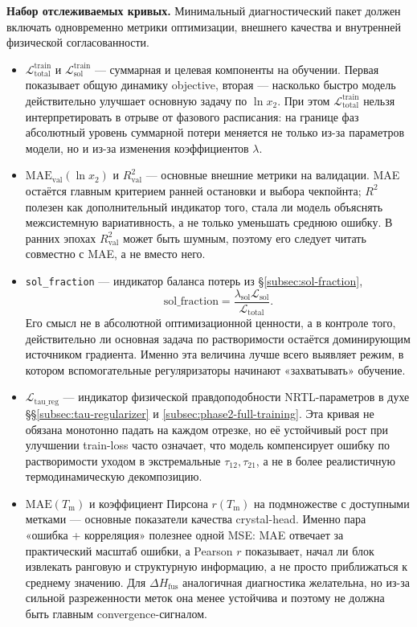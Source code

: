 \documentclass[11pt]{article}
\begin{document}
\textbf{Набор отслеживаемых кривых.} Минимальный диагностический пакет должен включать одновременно метрики оптимизации, внешнего качества и внутренней физической согласованности.
\begin{itemize}
  \item $\mathcal{L}_{\mathrm{total}}^{\mathrm{train}}$ и $\mathcal{L}_{\mathrm{sol}}^{\mathrm{train}}$ --- суммарная и целевая компоненты на обучении. Первая показывает общую динамику objective, вторая --- насколько быстро модель действительно улучшает основную задачу по $\ln x_2$. При этом $\mathcal{L}_{\mathrm{total}}^{\mathrm{train}}$ нельзя интерпретировать в отрыве от фазового расписания: на границе фаз абсолютный уровень суммарной потери меняется не только из-за параметров модели, но и из-за изменения коэффициентов $\lambda$.
  \item $\mathrm{MAE}_{\mathrm{val}}(\ln x_2)$ и $R^2_{\mathrm{val}}$ --- основные внешние метрики на валидации. MAE остаётся главным критерием ранней остановки и выбора чекпойнта; $R^2$ полезен как дополнительный индикатор того, стала ли модель объяснять межсистемную вариативность, а не только уменьшать среднюю ошибку. В ранних эпохах $R^2_{\mathrm{val}}$ может быть шумным, поэтому его следует читать совместно с MAE, а не вместо него.
  \item \texttt{sol\_fraction} --- индикатор баланса потерь из §\ref{subsec:sol-fraction},
  \begin{equation*}
  \mathrm{sol\_fraction} = \frac{\lambda_{\mathrm{sol}}\mathcal{L}_{\mathrm{sol}}}{\mathcal{L}_{\mathrm{total}}}.
  \end{equation*}
  Его смысл не в абсолютной оптимизационной ценности, а в контроле того, действительно ли основная задача по растворимости остаётся доминирующим источником градиента. Именно эта величина лучше всего выявляет режим, в котором вспомогательные регуляризаторы начинают «захватывать» обучение.
  \item $\mathcal{L}_{\mathrm{tau\_reg}}$ --- индикатор физической правдоподобности NRTL-параметров в духе §§\ref{subsec:tau-regularizer} и \ref{subsec:phase2-full-training}. Эта кривая не обязана монотонно падать на каждом отрезке, но её устойчивый рост при улучшении train-loss часто означает, что модель компенсирует ошибку по растворимости уходом в экстремальные $\tau_{12},\tau_{21}$, а не в более реалистичную термодинамическую декомпозицию.
  \item $\mathrm{MAE}(T_{\mathrm{m}})$ и коэффициент Пирсона $r(T_{\mathrm{m}})$ на подмножестве с доступными метками --- основные показатели качества crystal-head. Именно пара «ошибка + корреляция» полезнее одной MSE: MAE отвечает за практический масштаб ошибки, а Pearson $r$ показывает, начал ли блок извлекать ранговую и структурную информацию, а не просто приближаться к среднему значению. Для $\Delta H_{\mathrm{fus}}$ аналогичная диагностика желательна, но из-за сильной разреженности меток она менее устойчива и поэтому не должна быть главным convergence-сигналом.

\end{itemize}
\end{document}
